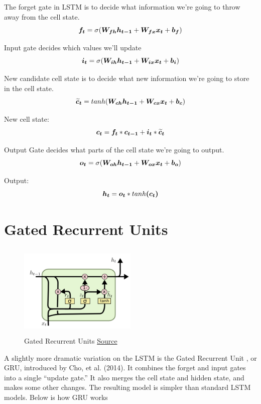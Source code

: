 The forget gate in LSTM is to decide what information we’re going to throw away from the cell state.
\[\vect{f_t} = \sigma(\matr{W_{fh}}\vect{h_{t-1}}+\matr{W_{fx}}\vect{x_t} + \vect{b_f}) \]

Input gate decides which values we’ll update
\[\vect{i_t} = \sigma(\matr{W_{ih}}\vect{h_{t-1}} + \matr{W_{ix}}\vect{x_t} + \vect{b_i})\]

New candidate cell state is to decide what new information we’re going to store in the cell state.
\[\vect{\widetilde{c}_t} = tanh(\matr{W_{ch}}\vect{h_{t-1}} + \matr{W_{cx}}\vect{x_t} + \vect{b_c})\]

New cell state:
\[\vect{c_t} = \vect{f_t}*\vect{c_{t-1}} + \vect{i_t}*\vect{\widetilde{c}_t}\]

Output Gate decides what parts of the cell state we’re going to output.
\[\vect{o_t} = \sigma(\matr{W_{oh}}\vect{h_{t-1}} + \matr{W_{ox}}\vect{x_t} + \vect{b_o})\]

Output:
\[\vect{h_t} = \vect{o_t}*tanh\vect{(c_t)}\]

\section{Gated Recurrent Units}

\begin{figure}[h]
  \centering
      \includegraphics[width=0.5\textwidth,height=4.5cm]{lectures/06-b-rnn/image/GRU.png}
          \caption{
            Gated Recurrent Units
            \href{http://colah.github.io/posts/2015-08-Understanding-LSTMs/}{Source}
          }
          \label{fig:lstm}
\end{figure}

A slightly more dramatic variation on the LSTM is the Gated Recurrent Unit \cite{1406.1078}, or GRU, introduced by Cho, et al. (2014).
It combines the forget and input gates into a single “update gate.” It also merges the cell state and hidden state, and makes some other changes. 
The resulting model is simpler than standard LSTM models.
Below is how GRU works


